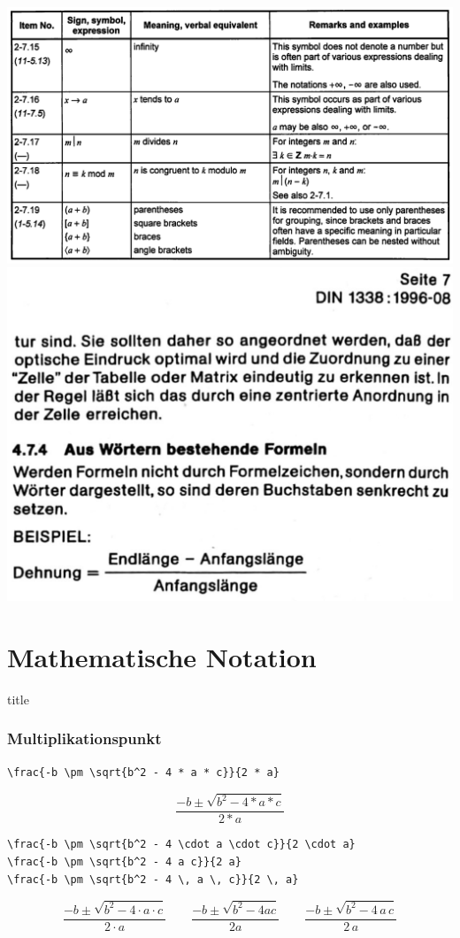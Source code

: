 \documentclass{beamer}
\makeatletter
\newcommand\sectiontitlepage{
    \miniframesoff
    \begin{frame}
        \vfill
        \centering
        \begin{beamercolorbox}[sep=8pt,center,shadow=true,rounded=true]{title}
            \usebeamerfont{title}\insertsectionhead\par%
        \end{beamercolorbox}
        \vfill
    \end{frame}
    \miniframeson
}
\let\beamer@writeslidentry@miniframeson=\beamer@writeslidentry
\def\beamer@writeslidentry@miniframesoff{%
    \expandafter\beamer@ifempty\expandafter{\beamer@framestartpage}{}%
    {%
        \clearpage\beamer@notesactions%
    }
}
\newcommand*{\miniframeson}{\let\beamer@writeslidentry=\beamer@writeslidentry@miniframeson}
\newcommand*{\miniframesoff}{\let\beamer@writeslidentry=\beamer@writeslidentry@miniframesoff}
\makeatother
\begin{document}
\begin{frame}[fragile]
    \includegraphics[height=0.32\textwidth]{images/iso-extract}\hfill
    \includegraphics[height=0.32\textwidth]{images/din-extract}
\end{frame}

\section{Mathematische Notation}

\sectiontitlepage

\begin{frame}[fragile]
    \frametitle{Multiplikationspunkt}
    \begin{wrong}
        \begin{lstlisting}
\frac{-b \pm \sqrt{b^2 - 4 * a * c}}{2 * a}
        \end{lstlisting}
    \end{wrong}
    \pause
    \begin{wrong}
        \begin{equation*}
            \frac{-b \pm \sqrt{b^2 - 4 * a * c}}{2 * a}
        \end{equation*}
    \end{wrong}
    \pause
    \begin{lstlisting}
\frac{-b \pm \sqrt{b^2 - 4 \cdot a \cdot c}}{2 \cdot a}
\frac{-b \pm \sqrt{b^2 - 4 a c}}{2 a}
\frac{-b \pm \sqrt{b^2 - 4 \, a \, c}}{2 \, a}
    \end{lstlisting}

    \begin{equation*}
        \frac{-b \pm \sqrt{b^2 - 4 \cdot a \cdot c}}{2 \cdot a}
        \qquad
        \frac{-b \pm \sqrt{b^2 - 4 a c}}{2 a}
        \qquad
        \frac{-b \pm \sqrt{b^2 - 4 \, a \, c}}{2 \, a}
    \end{equation*}
    \pause
\end{frame}
\end{document}
